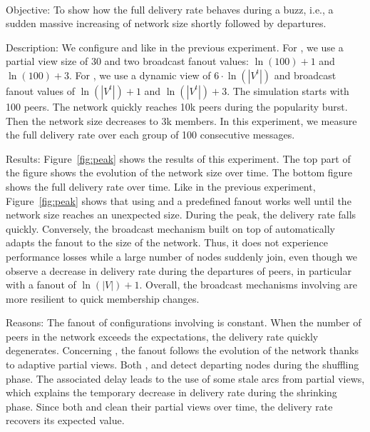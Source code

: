 \ \\

\begin{asparadesc}
\item [Objective:] To show how the full delivery rate behaves during a buzz,
  i.e., a sudden massive increasing of network size shortly followed by
  departures.
\item [Description:] We configure \SPRAY and \CYCLON like in the
  previous experiment. For \CYCLON, we use a partial view size of 30
  and two broadcast fanout values: $\ln(100)+1$ and $\ln(100)+3$. For
  \SPRAY, we use a dynamic view of $6 \cdot \ln(|V^t|)$ and broadcast
  fanout values of $\ln(|V^t|)+1$ and $\ln(|V^t|)+3$. The simulation
  starts with 100 peers. The network quickly reaches 10k peers during
  the popularity burst. Then the network size decreases to 3k
  members. In this experiment, we measure the full delivery rate over
  each group of 100 consecutive messages.
\item [Results:] Figure~\ref{fig:peak} shows the results of this
  experiment. The top part of the figure shows the evolution of the
  network size over time. The bottom figure shows the full delivery
  rate over time. Like in the previous experiment,
  Figure~\ref{fig:peak} shows that using \CYCLON and a predefined
  fanout works well until the network size reaches an unexpected
  size. During the peak, the delivery rate falls quickly. Conversely,
  the broadcast mechanism built on top of \SPRAY automatically adapts
  the fanout to the size of the network. Thus, it does not experience
  performance losses while a large number of nodes suddenly join, even
  though we observe a decrease in delivery rate during the departures
  of peers, in particular with a fanout of $\ln(|V|)+1$. Overall, the
  broadcast mechanisms involving \SPRAY are more resilient to quick
  membership changes.
\item [Reasons:] The fanout of configurations involving \CYCLON is
  constant. When the number of peers in the network exceeds the
  expectations, the delivery rate quickly degenerates. Concerning
  \SPRAY, the fanout follows the evolution of the network thanks to
  adaptive partial views. Both \SPRAY, and \CYCLON detect departing
  nodes during the shuffling phase. The associated delay leads to the
  use of some stale arcs from partial views, which explains the
  temporary decrease in delivery rate during the shrinking
  phase. Since both \CYCLON and \SPRAY clean their partial views over
  time, the delivery rate recovers its expected value.
\end{asparadesc}

